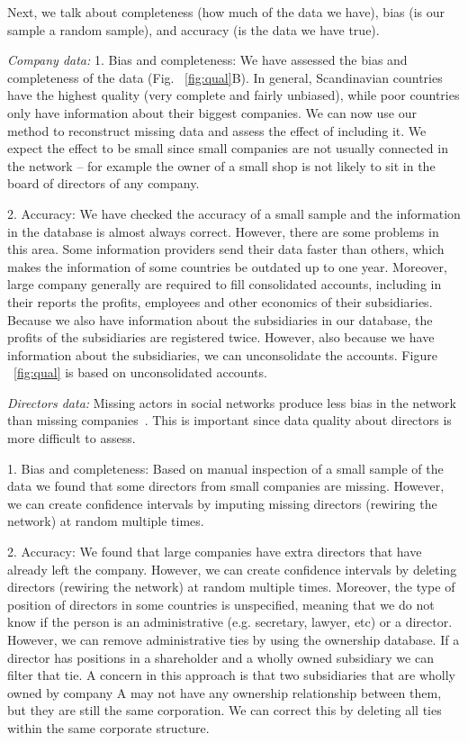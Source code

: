 Next, we talk about completeness (how much of the data we have), 
bias (is our sample a random sample), 
and accuracy (is the data we have true). 

\textit{Company data: }
1. Bias and completeness: 
We have assessed the bias and completeness of the data (Fig. ~\ref{fig:qual}B). 
In general, Scandinavian countries have the highest quality (very complete and fairly unbiased), 
while poor countries only have information about their biggest companies.
We can now use our method to reconstruct missing data and assess the effect of including it. 
We expect the effect to be small since small companies are not usually connected in the network -- for example the owner of a small shop is not likely to sit in the board of directors of any company.

2.  Accuracy: 
We have checked the accuracy of a small sample and the information in the database is almost always correct. 
However, there are some problems in this area. 
Some information providers send their data faster than others, which makes the information of some countries be outdated up to one year. 
Moreover, large company generally are required to fill consolidated accounts, 
including in their reports the profits, employees and other economics of their subsidiaries. 
Because we also have information about the subsidiaries in our database, 
the profits of the subsidiaries are registered twice.
However, also because we have information about the subsidiaries,
we can unconsolidate the accounts.
Figure ~\ref{fig:qual} is based on unconsolidated accounts.

\textit{Directors data: }
Missing actors in social networks produce less bias in the network than missing companies~\citep{Kossinets2006}.
This is important since data quality about directors is more difficult to assess.

1. Bias and completeness: 
Based on manual inspection of a small sample of the data we found that some directors from small companies are missing. 
However, we can create confidence intervals by imputing missing directors (rewiring the network) at random multiple times.

2.  Accuracy: 
We found that large companies have extra directors that have already left the company. 
However, we can create confidence intervals by deleting directors (rewiring the network) at random multiple times.
Moreover, the type of position of directors in some countries is unspecified, 
meaning that we do not know if the person is an administrative (e.g. secretary, lawyer, etc) or a director.
However, we can remove administrative ties by using the ownership database. 
If a director has positions in a shareholder and a wholly owned subsidiary we can filter that tie. 
A concern in this approach is that two subsidiaries that are wholly owned by company A may not have any ownership relationship between them, 
but they are still the same corporation. 
We can correct this by deleting all ties within the same corporate structure.


